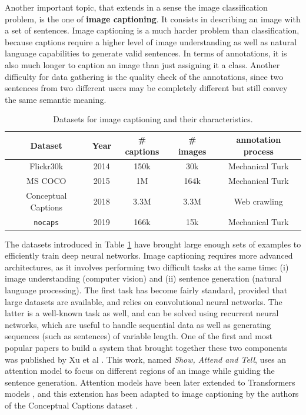 Another important topic, that extends in a sense the image classification problem, is the one of \textbf{image captioning}. It consists in describing an image with a set of sentences. Image captioning is a much harder problem than classification, because captions require a higher level of image understanding as well as natural language capabilities to generate valid sentences. In terms of annotations, it is also much longer to caption an image than just assigning it a class. Another difficulty for data gathering is the quality check of the annotations, since two sentences from two different users may be completely different but still convey the same semantic meaning. 

\vspace{0.5cm}

\begin{table}
	\centering
	\caption{Datasets for image captioning and their characteristics.}
	\begin{tabular}{|c|c|c|c|c|}
		\hline
		Dataset & Year & \# captions & \# images & annotation process \\
		\hline
		Flickr30k \cite{flickr30k} & 2014 & 150k & 30k & Mechanical Turk \\
		MS COCO \cite{chen2015microsoft} & 2015 & 1M & 164k & Mechanical Turk \\
		Conceptual Captions \cite{sharma-etal-2018-conceptual} & 2018 & 3.3M & 3.3M & Web crawling \\
		\texttt{nocaps} \cite{agrawal2019nocaps} & 2019 &  166k & 15k & Mechanical Turk \\
		\hline
	\end{tabular}
	\label{tab:caption_ds}
\end{table}

The datasets introduced in Table \ref{tab:caption_ds} have brought large enough sets of examples to efficiently train deep neural networks. Image captioning requires more advanced architectures, as it involves performing two difficult tasks at the same time: (i) image understanding (computer vision) and (ii) sentence generation (natural language processing). The first task has become fairly standard, provided that large datasets are available, and relies on convolutional neural networks. The latter is a well-known task as well, and can be solved using recurrent neural networks, which are useful to handle sequential data as well as generating sequences (such as sentences) of variable length. One of the first and most popular papers to build a system that brought together these two components was published by Xu et al \cite{xu2015show}. This work, named \textit{Show, Attend and Tell}, uses an attention model to focus on different regions of an image while guiding the sentence generation. Attention models have been later extended to Transformers models \cite{vaswani2017attention}, and this extension has been adapted to image captioning by the authors of the Conceptual Captions dataset \cite{sharma-etal-2018-conceptual}.

